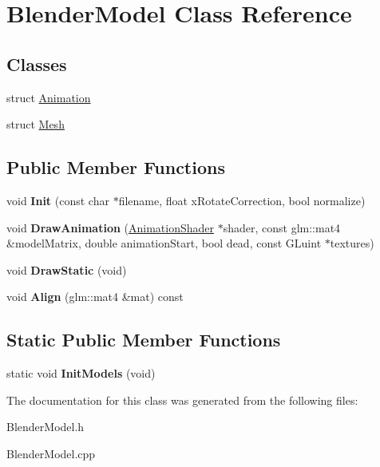 \hypertarget{classBlenderModel}{\section{\-Blender\-Model \-Class \-Reference}
\label{classBlenderModel}
}
\subsection*{\-Classes}
\begin{DoxyCompactItemize}
\item 
struct \hyperlink{structBlenderModel_1_1Animation}{\-Animation}
\item 
struct \hyperlink{structBlenderModel_1_1Mesh}{\-Mesh}
\end{DoxyCompactItemize}
\subsection*{\-Public \-Member \-Functions}
\begin{DoxyCompactItemize}
\item 
\hypertarget{classBlenderModel_aa0db3fbe9f08981d68a61063479f9d7d}{void {\bfseries \-Init} (const char $\ast$filename, float x\-Rotate\-Correction, bool normalize)}\label{classBlenderModel_aa0db3fbe9f08981d68a61063479f9d7d}

\item 
\hypertarget{classBlenderModel_abea2e166ff05f9425bc3dffba0073571}{void {\bfseries \-Draw\-Animation} (\hyperlink{classAnimationShader}{\-Animation\-Shader} $\ast$shader, const glm\-::mat4 \&model\-Matrix, double animation\-Start, bool dead, const \-G\-Luint $\ast$textures)}\label{classBlenderModel_abea2e166ff05f9425bc3dffba0073571}

\item 
\hypertarget{classBlenderModel_ae095955865ba418b0493ae61b2e0e289}{void {\bfseries \-Draw\-Static} (void)}\label{classBlenderModel_ae095955865ba418b0493ae61b2e0e289}

\item 
\hypertarget{classBlenderModel_a4f3ea09170d536739f31c9506853ae86}{void {\bfseries \-Align} (glm\-::mat4 \&mat) const }\label{classBlenderModel_a4f3ea09170d536739f31c9506853ae86}

\end{DoxyCompactItemize}
\subsection*{\-Static \-Public \-Member \-Functions}
\begin{DoxyCompactItemize}
\item 
\hypertarget{classBlenderModel_af12b4e4b9ca5847ace10484f11be6201}{static void {\bfseries \-Init\-Models} (void)}\label{classBlenderModel_af12b4e4b9ca5847ace10484f11be6201}

\end{DoxyCompactItemize}


\-The documentation for this class was generated from the following files\-:\begin{DoxyCompactItemize}
\item 
\-Blender\-Model.\-h\item 
\-Blender\-Model.\-cpp\end{DoxyCompactItemize}
